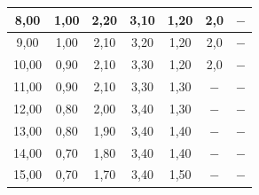 \documentclass{article}
\begin{document}
\begin{table}[!ht]
\begin{tabular}{|c|c|c|c||c|c|c|}
8,00                                                                                                               & 1,00                           & 2,20                          & 3,10                            & 1,20                           & 2,0                           & $-$                             \\ \hline
9,00                                                                                                               & 1,00                           & 2,10                          & 3,20                            & 1,20                           & 2,0                           & $-$                             \\ \hline
10,00                                                                                                              & 0,90                           & 2,10                          & 3,30                            & 1,20                           & 2,0                           & $-$                             \\ \hline
11,00                                                                                                              & 0,90                           & 2,10                          & 3,30                            & 1,30                           & $-$                           & $-$                             \\ \hline
12,00                                                                                                              & 0,80                           & 2,00                          & 3,40                            & 1,30                           & $-$                           & $-$                             \\ \hline
13,00                                                                                                              & 0,80                           & 1,90                          & 3,40                            & 1,40                           & $-$                           & $-$                             \\ \hline
14,00                                                                                                              & 0,70                           & 1,80                          & 3,40                            & 1,40                           & $-$                           & $-$                             \\ \hline
15,00                                                                                                              & 0,70                           & 1,70                          & 3,40                            & 1,50                           & $-$                           & $-$                             \\ \hline

\end{tabular}
\end{table}
\end{document}
